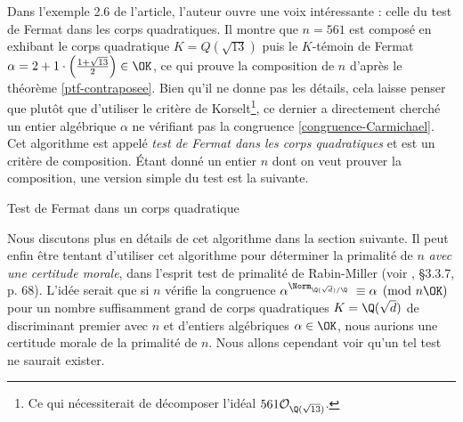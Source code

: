 Dans l'exemple 2.6 de l'article, l'auteur ouvre une voix intéressante : celle du test de Fermat dans les corps quadratiques. Il montre que $n = 561$ est composé en exhibant le corps quadratique $K = Q(\sqrt{13})$ puis le $K$-témoin de Fermat $\alpha = 2 + 1\cdot \left(\frac{1 + \sqrt{13}}{2}\right) \in \OK$, ce qui prouve la composition de $n$ d'après le théorème \ref{ptf-contraposee}. Bien qu'il ne donne pas les détails, cela laisse penser que plutôt que d'utiliser le critère de Korselt\footnote{Ce qui nécessiterait de décomposer l'idéal $561\mathcal{O}_{\Q(\sqrt{13})}$.}, ce dernier a directement cherché un entier algébrique $\alpha$ ne vérifiant pas la congruence \ref{congruence-Carmichael}. Cet algorithme est appelé \emph{test de Fermat dans les corps quadratiques} et est un critère de composition. Étant donné un entier $n$ dont on veut prouver la composition, une version simple du test est la suivante.

\vspace{1em}
\begin{algorithm}[H]\label{test-Fermat-quadratique}
\caption{Test de Fermat dans un corps quadratique}
\end{algorithm}
\vspace{1em}

Nous discutons plus en détails de cet algorithme dans la section suivante. Il peut enfin être tentant d'utiliser cet algorithme pour déterminer la primalité de $n$ \emph{avec une certitude morale}, dans l'esprit test de primalité de Rabin-Miller (voir \cite{Demazure}, §3.3.7, p. 68). L'idée serait que si $n$ vérifie la congruence $\alpha^{\Norm_{\Q(\sqrt{d})/\Q}} \equiv \alpha \pmod{n\OK}$ pour un nombre suffisamment grand de corps quadratiques $K = \Q(\sqrt{d})$ de discriminant premier avec $n$ et d'entiers algébriques $\alpha \in \OK$, nous aurions une certitude morale de la primalité de $n$. Nous allons cependant voir qu'un tel test ne saurait exister. \\

